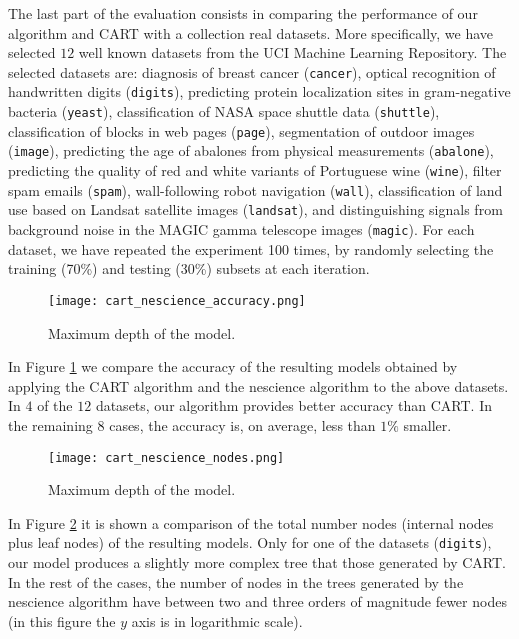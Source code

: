 The last part of the evaluation consists in comparing the performance of our algorithm and CART with a collection real datasets. More specifically, we have selected $12$ well known datasets from the UCI Machine Learning Repository. The selected datasets are: diagnosis of breast cancer (\texttt{cancer}), optical recognition of handwritten digits (\texttt{digits}), predicting protein localization sites in gram-negative bacteria (\texttt{yeast}), classification of NASA space shuttle data (\texttt{shuttle}), classification of blocks in web pages (\texttt{page}), segmentation of outdoor images (\texttt{image}), predicting the age of abalones from physical measurements (\texttt{abalone}), predicting the quality of red and white variants of Portuguese wine (\texttt{wine}), filter spam emails (\texttt{spam}), wall-following robot navigation (\texttt{wall}), classification of land use based on Landsat satellite images (\texttt{landsat}), and distinguishing signals from background noise in the MAGIC gamma telescope images (\texttt{magic}). For each dataset, we have repeated the experiment 100 times, by randomly selecting the training (70\%) and testing (30\%) subsets at each iteration.

\begin{figure}[h]
\centering
\texttt{[image: cart\_nescience\_accuracy.png]}
\caption{Maximum depth of the model.}
\label{figure:cart_nescience_accuracy}
\end{figure}

In Figure \ref{figure:cart_nescience_accuracy} we compare the accuracy of the resulting models obtained by applying the CART algorithm and the nescience algorithm to the above datasets. In $4$ of the $12$ datasets, our algorithm provides better accuracy than CART. In the remaining $8$ cases, the accuracy is, on average, less than $1\%$ smaller.

\begin{figure}[h]
\centering
\texttt{[image: cart\_nescience\_nodes.png]}
\caption{Maximum depth of the model.}
\label{figure:cart_nescience_nodes}
\end{figure}

In Figure \ref{figure:cart_nescience_nodes} it is shown a comparison of the total number nodes (internal nodes plus leaf nodes) of the resulting models. Only for one of the datasets (\texttt{digits}), our model produces a slightly more complex tree that those generated by CART. In the rest of the cases, the number of nodes in the trees generated by the nescience algorithm have between two and three orders of magnitude fewer nodes (in this figure the $y$ axis is in logarithmic scale).

